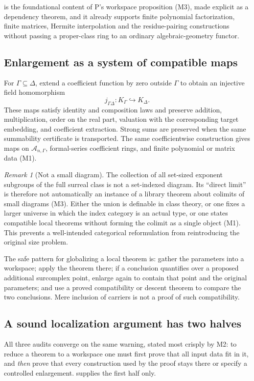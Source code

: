 \documentclass[11pt,letterpaper]{article}
\numberwithin{equation}{section}
\theoremstyle{definition}
\theoremstyle{remark}
\newtheorem{remark}[theorem]{Remark}
\newcommand{\Ag}{\mathscr A}
\begin{document}
 is the foundational content of P's workspace
proposition (M3), made explicit as a dependency theorem, and it already supports
finite polynomial factorization, finite matrices, Hermite interpolation and the
residue-pairing constructions without passing a proper-class ring to an
ordinary algebraic-geometry functor.

\subsection{Enlargement as a system of compatible maps}
\label{found:sub:enlargement}
For $\Gamma\subseteq\Delta$, extend a coefficient function by zero outside
$\Gamma$ to obtain an injective field homomorphism
\[
 j_{\Gamma\Delta}:K_\Gamma\hookrightarrow K_\Delta .
\]
These maps satisfy identity and composition laws and preserve addition,
multiplication, order on the real part, valuation with the corresponding target
embedding, and coefficient extraction. Strong sums are preserved when the same
summability certificate is transported. The same coefficientwise construction
gives maps on $\Ag_{n,\Gamma}$, formal-series coefficient rings, and finite
polynomial or matrix data (M1).

\begin{remark}[Not a small diagram]\label{found:rem:colimit}
The collection of all set-sized exponent subgroups of the full surreal class is
not a set-indexed diagram. Its ``direct limit'' is therefore not automatically an
instance of a library theorem about colimits of small diagrams (M3). Either the
union is definable in class theory, or one fixes a larger universe in which the
index category is an actual type, or one states compatible local theorems
without forming the colimit as a single object (M1). This prevents a
well-intended categorical reformulation from reintroducing the original size
problem.
\end{remark}

The safe pattern for globalizing a local theorem is: gather the parameters into
a workspace; apply the theorem there; if a conclusion quantifies over a proposed
additional surcomplex point, enlarge again to contain that point and the
original parameters; and use a proved compatibility or descent theorem to
compare the two conclusions. Mere inclusion of carriers is not a proof of such
compatibility.

\subsection{A sound localization argument has two halves}
\label{found:sub:twohalves}
All three audits converge on the same warning, stated most crisply by M2: to
reduce a theorem to a workspace one must first prove that all input data fit in
it, and \emph{then} prove that every construction used by the proof stays there
or specify a controlled enlargement.  supplies the
first half only.
\end{document}
